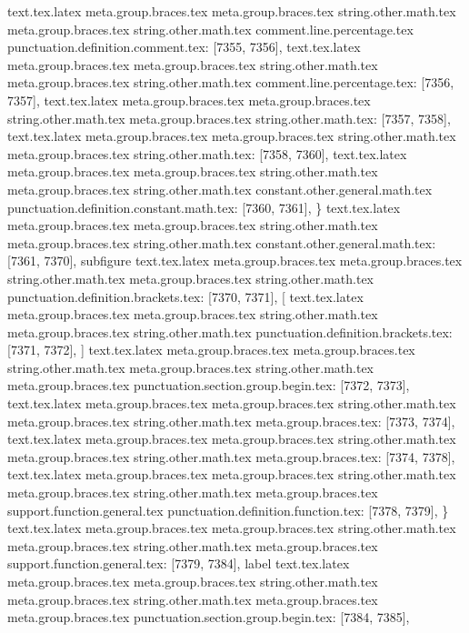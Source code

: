 {{{{{{{{{{{{{{{{{{{{{{{{{{{{{{{{{{{{{{{{{{{{{{{{{{{{{{{{{{{{{{{{{{{{{{{{{{{{{{{{{{{{{{{{{{{{{{{{{{{{{{{{{{{{{{{{{{{{{{{{{{{{{{{{{{{{{{{{{{{{{{{{{{{{{{{{{{{{{{{{{{{{{{{{{{{{{{{{{{{{{{{{{{{{{{{{{{{text.tex.latex meta.group.braces.tex meta.group.braces.tex string.other.math.tex meta.group.braces.tex string.other.math.tex comment.line.percentage.tex punctuation.definition.comment.tex: [7355, 7356], {%
text.tex.latex meta.group.braces.tex meta.group.braces.tex string.other.math.tex meta.group.braces.tex string.other.math.tex comment.line.percentage.tex: [7356, 7357], {%
text.tex.latex meta.group.braces.tex meta.group.braces.tex string.other.math.tex meta.group.braces.tex string.other.math.tex: [7357, 7358], {
}
text.tex.latex meta.group.braces.tex meta.group.braces.tex string.other.math.tex meta.group.braces.tex string.other.math.tex: [7358, 7360], {  }
text.tex.latex meta.group.braces.tex meta.group.braces.tex string.other.math.tex meta.group.braces.tex string.other.math.tex constant.other.general.math.tex punctuation.definition.constant.math.tex: [7360, 7361], {\}
text.tex.latex meta.group.braces.tex meta.group.braces.tex string.other.math.tex meta.group.braces.tex string.other.math.tex constant.other.general.math.tex: [7361, 7370], {subfigure}
text.tex.latex meta.group.braces.tex meta.group.braces.tex string.other.math.tex meta.group.braces.tex string.other.math.tex punctuation.definition.brackets.tex: [7370, 7371], {[}
text.tex.latex meta.group.braces.tex meta.group.braces.tex string.other.math.tex meta.group.braces.tex string.other.math.tex punctuation.definition.brackets.tex: [7371, 7372], {]}
text.tex.latex meta.group.braces.tex meta.group.braces.tex string.other.math.tex meta.group.braces.tex string.other.math.tex meta.group.braces.tex punctuation.section.group.begin.tex: [7372, 7373], {{}
text.tex.latex meta.group.braces.tex meta.group.braces.tex string.other.math.tex meta.group.braces.tex string.other.math.tex meta.group.braces.tex: [7373, 7374], {
}
text.tex.latex meta.group.braces.tex meta.group.braces.tex string.other.math.tex meta.group.braces.tex string.other.math.tex meta.group.braces.tex: [7374, 7378], {    }
text.tex.latex meta.group.braces.tex meta.group.braces.tex string.other.math.tex meta.group.braces.tex string.other.math.tex meta.group.braces.tex support.function.general.tex punctuation.definition.function.tex: [7378, 7379], {\}
text.tex.latex meta.group.braces.tex meta.group.braces.tex string.other.math.tex meta.group.braces.tex string.other.math.tex meta.group.braces.tex support.function.general.tex: [7379, 7384], {label}
text.tex.latex meta.group.braces.tex meta.group.braces.tex string.other.math.tex meta.group.braces.tex string.other.math.tex meta.group.braces.tex meta.group.braces.tex punctuation.section.group.begin.tex: [7384, 7385], {{}
}}}}}}}}}}}}}}}}}}}}}}}}}}}}}}}}}}}}}}}}}}}}}}}}}}}}}}}}}}}}}}}}}}}}}}}}}}}}}}}}}}}}}}}}}}}}}}}}}}}}}}}}}}}}}}}}}}}}}}}}}}}}}}}}}}}}}}}}}}}}}}}}}}}}}}}}}}}}}}}}}}}}}}}}}}}}}}}}}}}}}}}}}}}}}}}}}}}}}}}}}
